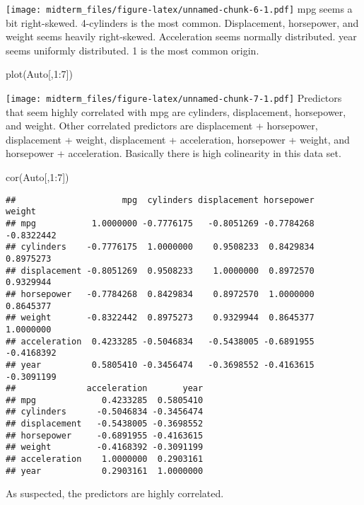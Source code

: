 \documentclass[
]{article}
\newenvironment{Shaded}{\begin{snugshade}}{\end{snugshade}}
\newcommand{\DecValTok}[1]{\textcolor[rgb]{0.00,0.00,0.81}{#1}}
\newcommand{\FunctionTok}[1]{\textcolor[rgb]{0.00,0.00,0.00}{#1}}
\newcommand{\NormalTok}[1]{#1}
\newcommand{\SpecialCharTok}[1]{\textcolor[rgb]{0.00,0.00,0.00}{#1}}
\begin{document}
\texttt{[image: midterm\_files/figure-latex/unnamed-chunk-6-1.pdf]} mpg
seems a bit right-skewed. 4-cylinders is the most common. Displacement,
horsepower, and weight seems heavily right-skewed. Acceleration seems
normally distributed. year seems uniformly distributed. 1 is the most
common origin.

\begin{Shaded}
\begin{Highlighting}[]
\FunctionTok{plot}\NormalTok{(Auto[,}\DecValTok{1}\SpecialCharTok{:}\DecValTok{7}\NormalTok{])}
\end{Highlighting}
\end{Shaded}

\texttt{[image: midterm\_files/figure-latex/unnamed-chunk-7-1.pdf]}
Predictors that seem highly correlated with mpg are cylinders,
displacement, horsepower, and weight. Other correlated predictors are
displacement + horsepower, displacement + weight, displacement +
acceleration, horsepower + weight, and horsepower + acceleration.
Basically there is high colinearity in this data set.

\begin{Shaded}
\begin{Highlighting}[]
\FunctionTok{cor}\NormalTok{(Auto[,}\DecValTok{1}\SpecialCharTok{:}\DecValTok{7}\NormalTok{])}
\end{Highlighting}
\end{Shaded}

\begin{verbatim}
##                     mpg  cylinders displacement horsepower     weight
## mpg           1.0000000 -0.7776175   -0.8051269 -0.7784268 -0.8322442
## cylinders    -0.7776175  1.0000000    0.9508233  0.8429834  0.8975273
## displacement -0.8051269  0.9508233    1.0000000  0.8972570  0.9329944
## horsepower   -0.7784268  0.8429834    0.8972570  1.0000000  0.8645377
## weight       -0.8322442  0.8975273    0.9329944  0.8645377  1.0000000
## acceleration  0.4233285 -0.5046834   -0.5438005 -0.6891955 -0.4168392
## year          0.5805410 -0.3456474   -0.3698552 -0.4163615 -0.3091199
##              acceleration       year
## mpg             0.4233285  0.5805410
## cylinders      -0.5046834 -0.3456474
## displacement   -0.5438005 -0.3698552
## horsepower     -0.6891955 -0.4163615
## weight         -0.4168392 -0.3091199
## acceleration    1.0000000  0.2903161
## year            0.2903161  1.0000000
\end{verbatim}

As suspected, the predictors are highly correlated.
\end{document}
